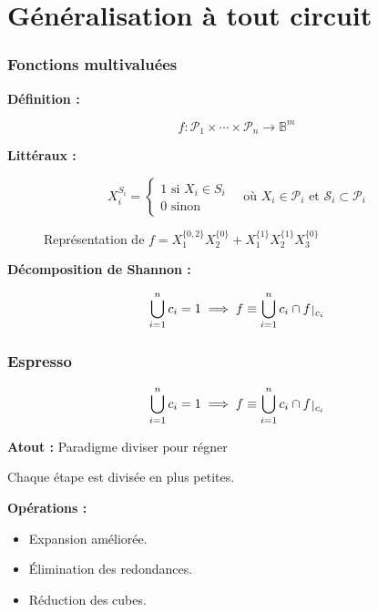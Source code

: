 \documentclass[handout]{beamer}
\newcommand{\ens}[1]{{\lbrace{} #1 \rbrace{}}}
\def\restriction#1#2{\mathchoice
              {\setbox1\hbox{${\displaystyle #1}_{\scriptstyle #2}$}
              \restrictionaux{#1}{#2}}
              {\setbox1\hbox{${\textstyle #1}_{\scriptstyle #2}$}
              \restrictionaux{#1}{#2}}
              {\setbox1\hbox{${\scriptstyle #1}_{\scriptscriptstyle #2}$}
              \restrictionaux{#1}{#2}}
              {\setbox1\hbox{${\scriptscriptstyle #1}_{\scriptscriptstyle #2}$}
              \restrictionaux{#1}{#2}}}
\def\restrictionaux#1#2{{#1\,\smash{\vrule height .8\ht1 depth .85\dp1}}_{\,#2}}
\begin{document}
\section{Généralisation à tout circuit}
\begin{frame}
  \frametitle{Fonctions multivaluées}

  \textbf{Définition :}
  \begin{mdframed}
  \[ f: \mathcal{P}_1 \times \cdots \times \mathcal{P}_n \longrightarrow \mathbb{B}^m \]
  \end{mdframed}

  \textbf{Littéraux :} 
  \begin{mdframed}
  \[{X_i^{S_i} = %
  \begin{cases}
    1 \text{ si } X_i \in S_i \\
    0 \text{ sinon}
  \end{cases}
  \quad \text{où } X_i \in \mathcal{P}_i \text{ et } \mathcal{S}_i \subset \mathcal{P}_i} \]
    \end{mdframed}  
  
  
  \begin{figure}
  \centering
	  \begin{tikzpicture}[scale=2]  
  		
	  \end{tikzpicture}
	  \caption{Représentation de $f = X_1^\ens{0,2} X_2^\ens{0} + X_1^\ens{1} X_2^\ens{1}X_3^\ens{0}$}
	\end{figure}

  \textbf{Décomposition de Shannon :}
  \begin{mdframed}
  \[ \bigcup_{i=1}^n c_i = 1 \implies f \equiv \bigcup_{i=1}^{n} c_i \cap \restriction{f}{c_i} \]
  \end{mdframed}

\end{frame}

\begin{frame}
  \frametitle{Espresso}

  \[ \bigcup_{i=1}^n c_i = 1 \implies f \equiv \bigcup_{i=1}^{n} c_i \cap \restriction{f}{c_i}\]

  \textbf{Atout :} Paradigme diviser pour régner
  \par Chaque étape est divisée en plus petites.
	
  \textbf{Opérations :}  
  \begin{itemize}
  \item Expansion améliorée.
  \item Élimination des redondances.
  \item Réduction des cubes.
  \end{itemize}
  
  
  
\end{frame}
\end{document}
